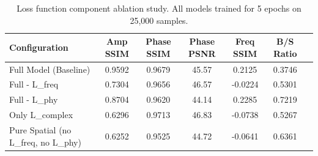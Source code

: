 \begin{table}[h]
\centering
\caption{Loss function component ablation study. All models trained for 5 epochs on 25,000 samples.}
\label{tab:loss_component_ablation}
\begin{tabular}{@{}lcccccc@{}}
\toprule
\textbf{Configuration} & \textbf{Amp SSIM} & \textbf{Phase SSIM} & \textbf{Phase PSNR} & \textbf{Freq SSIM} & \textbf{B/S Ratio} \\ \midrule
Full Model (Baseline) & 0.9592 & 0.9679 & 45.57 & 0.2125 & 0.3746 \\
Full - L_freq & 0.7304 & 0.9656 & 46.57 & -0.0224 & 0.5301 \\
Full - L_phy & 0.8704 & 0.9620 & 44.14 & 0.2285 & 0.7219 \\
Only L_complex & 0.6296 & 0.9713 & 46.83 & -0.0738 & 0.5267 \\
Pure Spatial (no L_freq, no L_phy) & 0.6252 & 0.9525 & 44.72 & -0.0641 & 0.6361 \\
\bottomrule
\end{tabular}
\end{table}
